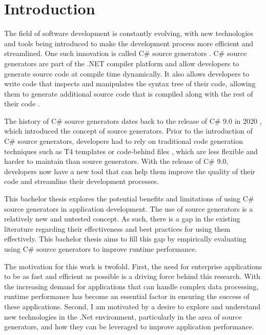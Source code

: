 \chapter{Introduction}

The field of software development is constantly evolving, with new technologies and tools being introduced to make the development process more efficient and streamlined. One such innovation is called C\# source generators \cite{Microsoft2022SourceGenerators}. C\# source generators are part of the .NET compiler platform \cite{Vermeir2022.NETPlatform} and allow developers to generate source code at compile time dynamically. It also allows developers to write code that inspects and manipulates the syntax tree of their code, allowing them to generate additional source code that is compiled along with the rest of their code \cite{Microsoft2022SourceGenerators, Slimak2022SourceSLIMAK, Franz2022TrendsCompilerbau}.

The history of C\# source generators dates back to the release of C\# 9.0 in 2020 \cite{Slimak2022SourceSLIMAK}, which introduced the concept of source generators. Prior to the introduction of C\# source generators, developers had to rely on traditional code generation techniques such as T4 templates \cite{Syriani2018SystematicGeneration} or code-behind files \cite{Tran2010UsingGeneration}, which are less flexible and harder to maintain than source generators. With the release of C\# 9.0, developers now have a new tool that can help them improve the quality of their code and streamline their development processes.

This bachelor thesis explores the potential benefits and limitations of using C\# source generators in application development. The use of source generators is a relatively new and untested concept. As such, there is a gap in the existing literature regarding their effectiveness and best practices for using them effectively. This bachelor thesis aims to fill this gap by empirically evaluating using C\# source generators to improve runtime performance.

The motivation for this work is twofold. First, the need for enterprise applications to be as fast and efficient as possible is a driving force behind this research. With the increasing demand for applications that can handle complex data processing, runtime performance has become an essential factor in ensuring the success of these applications. Second, I am motivated by a desire to explore and understand new technologies in the .Net environment, particularly in the area of source generators, and how they can be leveraged to improve application performance.
